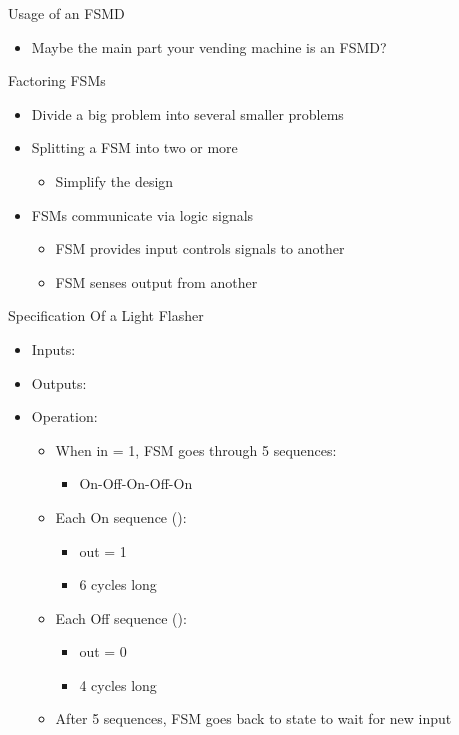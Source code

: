 \begin{frame}[fragile]{Usage of an FSMD}
\begin{itemize}
\item Maybe the main part your vending machine is an FSMD?
\end{itemize}
\end{frame}



\begin{frame}[fragile]{Factoring FSMs}
\begin{itemize}
\item Divide a big problem into several smaller problems
\item Splitting a FSM into two or more
\begin{itemize}
\item Simplify the design
\end{itemize}
\item FSMs communicate via logic signals
\begin{itemize}
\item FSM provides input controls signals to another
\item FSM senses output from another
\end{itemize}
\end{itemize}
\end{frame}

\begin{frame}[fragile]{Specification Of a Light Flasher}
\begin{itemize}
\item Inputs: 
\item Outputs: 
\item Operation:
\begin{itemize}
\item When in = 1, FSM goes through 5 sequences:
\begin{itemize}
\item On-Off-On-Off-On
\end{itemize}
\item Each On sequence ():
\begin{itemize}
\item out = 1
\item 6 cycles long
\end{itemize}
\item Each Off sequence ():
\begin{itemize}
\item out = 0
\item 4 cycles long
\end{itemize}
\item After 5 sequences, FSM goes back to  state to wait for new input
\end{itemize}
\end{itemize}
\end{frame}

